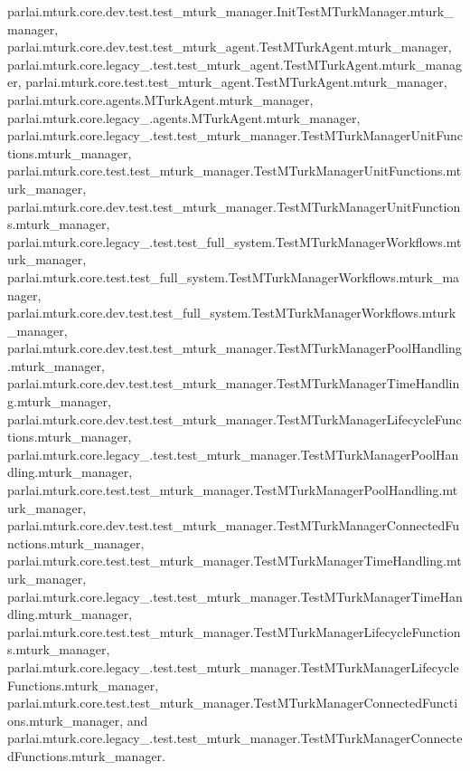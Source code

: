 parlai.\+mturk.\+core.\+dev.\+test.\+test\+\_\+mturk\+\_\+manager.\+Init\+Test\+M\+Turk\+Manager.\+mturk\+\_\+manager, parlai.\+mturk.\+core.\+dev.\+test.\+test\+\_\+mturk\+\_\+agent.\+Test\+M\+Turk\+Agent.\+mturk\+\_\+manager, parlai.\+mturk.\+core.\+legacy\+\_.\+test.\+test\+\_\+mturk\+\_\+agent.\+Test\+M\+Turk\+Agent.\+mturk\+\_\+manager, parlai.\+mturk.\+core.\+test.\+test\+\_\+mturk\+\_\+agent.\+Test\+M\+Turk\+Agent.\+mturk\+\_\+manager, parlai.\+mturk.\+core.\+agents.\+M\+Turk\+Agent.\+mturk\+\_\+manager, parlai.\+mturk.\+core.\+legacy\+\_.\+agents.\+M\+Turk\+Agent.\+mturk\+\_\+manager, parlai.\+mturk.\+core.\+legacy\+\_.\+test.\+test\+\_\+mturk\+\_\+manager.\+Test\+M\+Turk\+Manager\+Unit\+Functions.\+mturk\+\_\+manager, parlai.\+mturk.\+core.\+test.\+test\+\_\+mturk\+\_\+manager.\+Test\+M\+Turk\+Manager\+Unit\+Functions.\+mturk\+\_\+manager, parlai.\+mturk.\+core.\+dev.\+test.\+test\+\_\+mturk\+\_\+manager.\+Test\+M\+Turk\+Manager\+Unit\+Functions.\+mturk\+\_\+manager, parlai.\+mturk.\+core.\+legacy\+\_.\+test.\+test\+\_\+full\+\_\+system.\+Test\+M\+Turk\+Manager\+Workflows.\+mturk\+\_\+manager, parlai.\+mturk.\+core.\+test.\+test\+\_\+full\+\_\+system.\+Test\+M\+Turk\+Manager\+Workflows.\+mturk\+\_\+manager, parlai.\+mturk.\+core.\+dev.\+test.\+test\+\_\+full\+\_\+system.\+Test\+M\+Turk\+Manager\+Workflows.\+mturk\+\_\+manager, parlai.\+mturk.\+core.\+dev.\+test.\+test\+\_\+mturk\+\_\+manager.\+Test\+M\+Turk\+Manager\+Pool\+Handling.\+mturk\+\_\+manager, parlai.\+mturk.\+core.\+dev.\+test.\+test\+\_\+mturk\+\_\+manager.\+Test\+M\+Turk\+Manager\+Time\+Handling.\+mturk\+\_\+manager, parlai.\+mturk.\+core.\+dev.\+test.\+test\+\_\+mturk\+\_\+manager.\+Test\+M\+Turk\+Manager\+Lifecycle\+Functions.\+mturk\+\_\+manager, parlai.\+mturk.\+core.\+legacy\+\_.\+test.\+test\+\_\+mturk\+\_\+manager.\+Test\+M\+Turk\+Manager\+Pool\+Handling.\+mturk\+\_\+manager, parlai.\+mturk.\+core.\+test.\+test\+\_\+mturk\+\_\+manager.\+Test\+M\+Turk\+Manager\+Pool\+Handling.\+mturk\+\_\+manager, parlai.\+mturk.\+core.\+dev.\+test.\+test\+\_\+mturk\+\_\+manager.\+Test\+M\+Turk\+Manager\+Connected\+Functions.\+mturk\+\_\+manager, parlai.\+mturk.\+core.\+test.\+test\+\_\+mturk\+\_\+manager.\+Test\+M\+Turk\+Manager\+Time\+Handling.\+mturk\+\_\+manager, parlai.\+mturk.\+core.\+legacy\+\_.\+test.\+test\+\_\+mturk\+\_\+manager.\+Test\+M\+Turk\+Manager\+Time\+Handling.\+mturk\+\_\+manager, parlai.\+mturk.\+core.\+test.\+test\+\_\+mturk\+\_\+manager.\+Test\+M\+Turk\+Manager\+Lifecycle\+Functions.\+mturk\+\_\+manager, parlai.\+mturk.\+core.\+legacy\+\_.\+test.\+test\+\_\+mturk\+\_\+manager.\+Test\+M\+Turk\+Manager\+Lifecycle\+Functions.\+mturk\+\_\+manager, parlai.\+mturk.\+core.\+test.\+test\+\_\+mturk\+\_\+manager.\+Test\+M\+Turk\+Manager\+Connected\+Functions.\+mturk\+\_\+manager, and parlai.\+mturk.\+core.\+legacy\+\_.\+test.\+test\+\_\+mturk\+\_\+manager.\+Test\+M\+Turk\+Manager\+Connected\+Functions.\+mturk\+\_\+manager.

